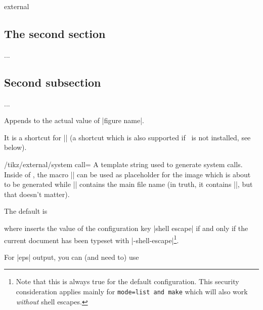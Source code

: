 \begin{pgfplotslibrary}{external}
\begin{command}{}
\begin{codeexample}
\section{The second section}
{
	...
	\subsection{Second subsection}
	{
		...
	}
}
\end{codeexample}
\end{command}

\begin{command}{\tikzappendtofigurename{}}
	Appends  to the actual value of |figure name|.

	It is a shortcut for || (a shortcut which is also supported if \tikzname\ is not installed, see below).
\end{command}


\begin{key}{/tikz/external/system call=}
\label{extlib:systemcall:option}
	A template string used to generate system calls. Inside of , the macro |\image| can be used as placeholder for the image which is about to be generated while |\texsource| contains the main file name (in truth, it contains ||, but that doesn't matter).

	The default is 
\begin{codeexample}[code only]
\tikzset{external/system call={pdflatex \tikzexternalcheckshellescape -halt-on-error 
    -interaction=batchmode -jobname "\image" "\texsource"}
\end{codeexample}
	\noindent where \declareandlabel{\tikzexternalcheckshellescape} inserts the value of the configuration key |shell escape|
	if and only if the current document has been typeset with |-shell-escape|\footnote{Note that this is always true for the default configuration. This security consideration applies mainly for \texttt{mode=list and make} which will also work \emph{without} shell escapes.}.

	For |eps| output, you can (and need to) use
\begin{codeexample}
\end{codeexample}
	

\end{key}
\end{pgfplotslibrary}
